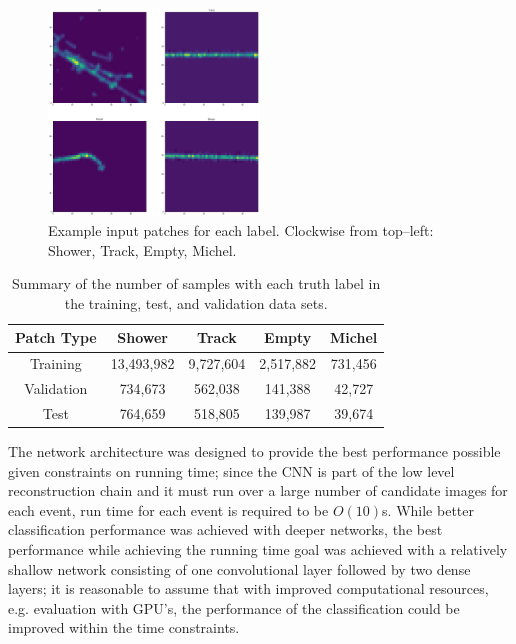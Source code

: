 \begin{figure}[h]
	\centering
	\includegraphics[width=0.5\textwidth]{figures/patch_examples.pdf}  
	\caption[Example input patches for each label.]{Example input patches for
	each label. Clockwise from top--left: Shower, Track, Empty, Michel.}
	\label{fig:patches}
\end{figure}

\begin{table}[h]
	\centering
	\begin{tabular}{c|c|c|c|c}
		Patch Type & Shower     & Track     & Empty     & Michel  \\ \hline
		Training   & 13,493,982 & 9,727,604 & 2,517,882 & 731,456 \\
		Validation & 734,673    & 562,038   & 141,388   & 42,727  \\
		Test       & 764,659    & 518,805   & 139,987   & 39,674 
	\end{tabular}
	\caption[Number of patches with each truth label.]{Summary of the number of
	samples with each truth label in the training, test, and validation data
	sets.}
	\label{tab:patches}
\end{table}

The network architecture was designed to provide the best performance possible
given constraints on running time; since the CNN is part of the low level
reconstruction chain and it must run over a large number of candidate images for
each event, run time for each event is required to be \(O(10)\)s. While better
classification performance was achieved with deeper networks, the best
performance while achieving the running time goal was achieved with a relatively
shallow network consisting of one convolutional layer followed by two dense
layers; it is reasonable to assume that with improved computational resources,
e.g. evaluation with GPU's, the performance of the classification could be
improved within the time constraints. 

